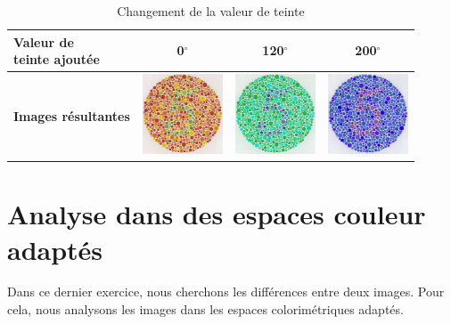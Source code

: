 \documentclass[a4paper,11pt]{article}
\begin{document}
\begin{table}[H]
  \begin{center}
  
    \begin{tabular}{|l||c|c|c|}
    
      \hline
      
      \bf \shortstack{ Valeur de \\ teinte ajoutée } &
      0$^{\circ}$ &
      120$^{\circ}$ &
      200$^{\circ}$ \\
      
      \hline
    
      \bf Images résultantes &
      \includegraphics[width=90px]{images/it3_72pp.png} & 
      \includegraphics[width=90px]{images/it3_120.png} & 
      \includegraphics[width=90px]{images/it3_200.png} \\
      
      \hline
    \end{tabular}
    
    \caption{Changement de la valeur de teinte}
    \label{tab:}
    
  \end{center}
\end{table}

\section{Analyse dans des espaces couleur adaptés}

Dans ce dernier exercice, nous cherchons les différences entre deux 
images. Pour cela, nous analysons les images dans les espaces 
colorimétriques adaptés.\\
\end{document}
